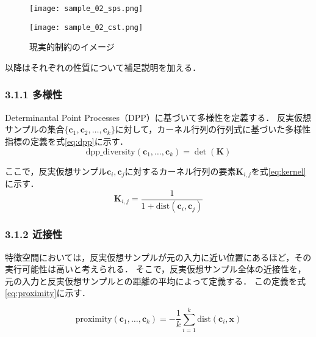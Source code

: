 \documentclass[dvipdfmx]{jreport}
\begin{document}
\begin{figure}[h]
    \centering
    \begin{minipage}[c]{0.49\linewidth}
        \centering
        \texttt{[image: sample\_02\_sps.png]}
        \label{tab:sps}
    \end{minipage}
    \hfill
    \centering
    \begin{minipage}[c]{0.49\linewidth}
        \centering
        \texttt{[image: sample\_02\_cst.png]}
        \caption{現実的制約のイメージ}
        \label{fig:cst}
    \end{minipage}
\end{figure}
以降はそれぞれの性質について補足説明を加える．

\subsubsection{3.1.1 多様性}
Determinantal Point Processes（DPP）に基づいて多様性を定義する．
反実仮想サンプルの集合$\{ \bm{c}_1, \bm{c}_2, \ldots, \bm{c}_k \}$に対して，カーネル行列の行列式に基づいた多様性指標の定義を式\eqref{eq:dpp}に示す．
\begin{equation} 
\text{dpp\_diversity}(\bm{c}_1, \ldots, \bm{c}_k) = \det(\mathbf{K}) \label{eq:dpp}
\end{equation}

ここで，反実仮想サンプル$\bm{c}_i,\bm{c}_j$に対するカーネル行列の要素$\mathbf{K}_{i,j}$を式\eqref{eq:kernel}に示す．
\begin{equation}
\mathbf{K}_{i,j} = \frac{1}{1 + \text{dist}(\bm{c}_i, \bm{c}_j)} \label{eq:kernel}
\end{equation}

\subsubsection{3.1.2 近接性}
特徴空間においては，反実仮想サンプルが元の入力に近い位置にあるほど，その実行可能性は高いと考えられる．
そこで，反実仮想サンプル全体の近接性を，元の入力と反実仮想サンプルとの距離の平均によって定義する．
この定義を式\eqref{eq:proximity}に示す．

\begin{equation}
\text{proximity}(\bm{c}_1, \ldots, \bm{c}_k) = - \frac{1}{k} \sum_{i=1}^{k} \text{dist}(\bm{c}_i, \bm{x}) \label{eq:proximity}
\end{equation}
\end{document}
